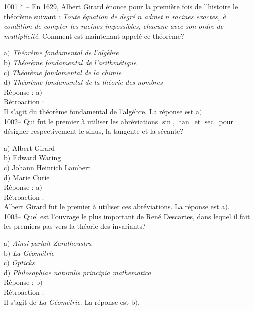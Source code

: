 ﻿\documentclass[letterpaper, 12pt]{article}
\begin{document}
1001 * -- En 1629, Albert Girard \'enonce pour la premi\`ere fois de
l'histoire le th\'eor\`eme suivant : {\sl Toute \'equation de
degr\'e $n$ admet $n$ racines exactes, \`a condition de compter les
racines impossibles, chacune avec son ordre de multiplicit\'e}.
Comment est maintenant appel\'e ce th\'eor\`eme?

a$)$ {\sl Th\'eor\`eme fondamental de l'alg\`ebre} \\
b$)$ {\sl Th\'eor\`eme fondamental de l'arithm\'etique} \\
c$)$ {\sl Th\'eor\`eme fondamental de la chimie} \\
d$)$ {\sl Th\'eor\`eme fondamental de la th\'eorie des nombres}\\

R\'eponse : a$)$\\

R\'etroaction : \\
Il s'agit du th\'eor\`eme fondamental de l'alg\`ebre.
La r\'eponse est a$)$.\\

1002-- Qui fut le premier \`a utiliser les abr\'eviations
\og$\sin$\fg, \og$\tan$\fg\ et \og$\sec$\fg\ pour d\'esigner
respectivement le sinus, la tangente et la s\'ecante?

a$)$ Albert Girard \\
b$)$ Edward Waring \\
c$)$ Johann Heinrich Lambert \\
d$)$ Marie Curie\\

R\'eponse : a$)$\\

R\'etroaction : \\
Albert Girard fut le premier \`a utiliser ces abr\'eviations.
La r\'eponse est a$)$.\\

1003-- Quel est l'ouvrage le plus important de Ren\'e Descartes,
dans lequel il fait les premiers pas vers la th\'eorie des
invariants?

a$)$ {\sl Ainsi parlait Zarathoustra} \\
b$)$ {\sl La G\'eom\'etrie} \\
c$)$ {\sl Opticks} \\
d$)$ {\sl Philosophiae naturalis principia mathematica}\\

R\'eponse : b$)$\\

R\'etroaction : \\
Il s'agit de {\sl La G\'eom\'etrie}.
La r\'eponse est b$)$.\\
\end{document}
